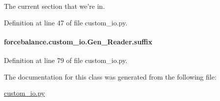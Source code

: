 The current section that we're in. 



Definition at line 47 of file custom\-\_\-io.\-py.

\hypertarget{classforcebalance_1_1custom__io_1_1Gen__Reader_a2312641f63fba30851dc3ab5279f76cf}{
\paragraph[{suffix}]{\setlength{\rightskip}{0pt plus 5cm}forcebalance.\-custom\-\_\-io.\-Gen\-\_\-\-Reader.\-suffix}}\label{classforcebalance_1_1custom__io_1_1Gen__Reader_a2312641f63fba30851dc3ab5279f76cf}


Definition at line 79 of file custom\-\_\-io.\-py.



The documentation for this class was generated from the following file\-:\begin{DoxyCompactItemize}
\item 
\hyperlink{custom__io_8py}{custom\-\_\-io.\-py}\end{DoxyCompactItemize}
